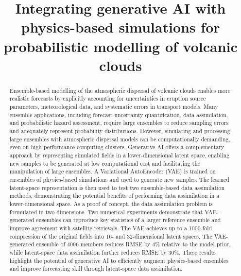 \documentclass[acp,manuscript]{copernicus}
\begin{document}
\title{Integrating generative AI with physics-based simulations for probabilistic modelling of volcanic clouds}





\received{}
\pubdiscuss{} 
\revised{}
\accepted{}
\published{}


\maketitle

\begin{abstract}
%
%
Ensemble-based modelling of the atmospheric dispersal of volcanic clouds enables more realistic forecasts by explicitly accounting for uncertainties in eruption source parameters, meteorological data, and systematic errors in transport models.
%
%
Many ensemble applications, including forecast uncertainty quantification, data assimilation, and probabilistic hazard assessment, require large ensembles to reduce sampling errors and adequately represent probability distributions. 
%
However, simulating and processing large ensembles with atmospheric dispersal models can be computationally demanding, even on high-performance computing clusters. Generative AI offers a complementary approach by representing simulated fields in a lower-dimensional latent space, enabling new samples to be generated at low computational cost and facilitating the manipulation of large ensembles.
%
%
A Variational AutoEncoder (VAE) is trained on ensembles of physics-based simulations and used to generate new samples. The learned latent-space representation is then used to test two ensemble-based data assimilation methods, demonstrating the potential benefits of performing data assimilation in a lower-dimensional space.
%
%
As a proof of concept, the data assimilation problem is formulated in two dimensions.
%
%
Two numerical experiments demonstrate that VAE-generated ensembles can reproduce key statistics of a larger reference ensemble and improve agreement with satellite retrievals. The VAE achieves up to a 1000-fold compression of the original fields into 16- and 32-dimensional latent spaces. The VAE-generated ensemble of 4096 members reduces RMSE by 4\% relative to the model prior, while latent-space data assimilation further reduces RMSE by 30\%.
%
%
These results highlight the potential of generative AI to efficiently augment physics-based ensembles and improve forecasting skill through latent-space data assimilation.
\end{abstract}
\end{document}
